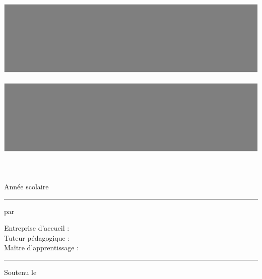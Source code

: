 \pagestyle{empty}

\begin{center}

    \begin{minipage}{0.3\textwidth}
        \includegraphics[width=\textwidth]{images/cover/logo_entreprise}
    \end{minipage}
    \hfill
    \begin{minipage}{0.3\textwidth}
        \includegraphics[width=\textwidth]{images/cover/logo_ecole}
    \end{minipage}

    \vspace{2 cm}

    {\LARGE{\titreSecondaire}} \\
    \vspace{0.5 cm}
    {\LARGE\textbf{\titrePrincipal}} \\
    \vspace{0.5 cm}
    \infoDiplome
    \vspace{0.5 cm}
    Année scolaire \anneeScolaire \\

    \vspace{1 cm}
    \rule{0.2\textwidth}{0.5pt}
    \vspace{1 cm}

    par \textbf{\nomAuteur} \\

    \vspace{0.5 cm}

    Entreprise d'accueil : \entrepriseAccueil \\
    Tuteur pédagogique : \tuteurPedagogique \\
    Maître d'apprentissage : \maitreApprentissage \\

    \vspace{1 cm}
    \rule{0.2\textwidth}{0.5pt}
    \vspace{1 cm}

    \descriptionMemoire

    \vspace{0.5 cm}

    Soutenu le \dateSoutenance \\

    \newpage

\end{center}
